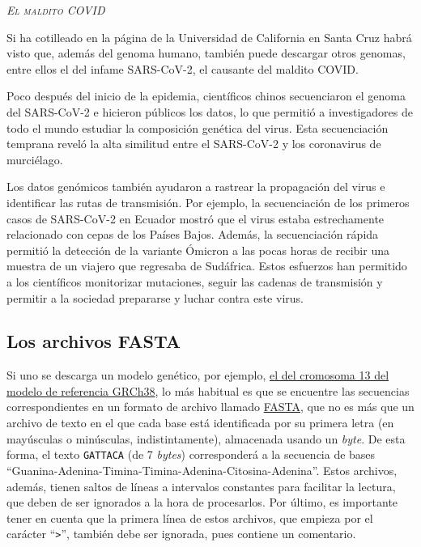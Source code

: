 \documentclass[10pt,a4paper,spanish]{article}
\newcommand{\sombreado}[2]{
  \begin{shaded}
    \begin{center} \emph{\textsc{#1}} \end{center}
    \noindent #2\\
  \end{shaded}
}
\newcommand{\code}[1]{\texttt{#1}}
\begin{document}
\sombreado{El maldito COVID}{Si ha cotilleado en la página de la Universidad de California en Santa Cruz habrá visto que, además del genoma humano, también puede descargar otros genomas, entre ellos el del infame SARS-CoV-2, el causante del maldito COVID.

Poco después del inicio de la epidemia, científicos chinos secuenciaron el genoma del SARS-CoV-2 e hicieron públicos los datos, lo que permitió a investigadores de todo el mundo estudiar la composición genética del virus. Esta secuenciación temprana reveló la alta similitud entre el SARS-CoV-2 y los coronavirus de murciélago.

Los datos genómicos también ayudaron a rastrear la propagación del virus e identificar las rutas de transmisión. Por ejemplo, la secuenciación de los primeros casos de SARS-CoV-2 en Ecuador mostró que el virus estaba estrechamente relacionado con cepas de los Países Bajos. Además, la secuenciación rápida permitió la detección de la variante Ómicron a las pocas horas de recibir una muestra de un viajero que regresaba de Sudáfrica. Estos esfuerzos han permitido a los científicos monitorizar mutaciones, seguir las cadenas de transmisión y permitir a la sociedad prepararse y luchar contra este virus.}

\subsection{Los archivos FASTA}

Si uno se descarga un modelo genético, por ejemplo, \href{https://hgdownload.cse.ucsc.edu/goldenPath/hg38/chromosomes/chr13.fa.gz}{el del cromosoma 13 del modelo de referencia GRCh38}, lo más habitual es que se encuentre las secuencias correspondientes en un formato de archivo llamado \href{https://en.wikipedia.org/wiki/FASTA_format}{FASTA}, que no es más que un archivo de texto en el que cada base está identificada por su primera letra (en mayúsculas o minúsculas, indistintamente), almacenada usando un \textit{byte}. De esta forma, el texto \code{GATTACA} (de 7 \textit{bytes}) corresponderá a la secuencia de bases ``Guanina-Adenina-Timina-Timina-Adenina-Citosina-Adenina''. Estos archivos, además, tienen saltos de líneas a intervalos constantes para facilitar la lectura, que deben de ser ignorados a la hora de procesarlos. Por último, es importante tener en cuenta que la primera línea de estos archivos, que empieza por el carácter ``\code{>}'', también debe ser ignorada, pues contiene un comentario.
\end{document}
